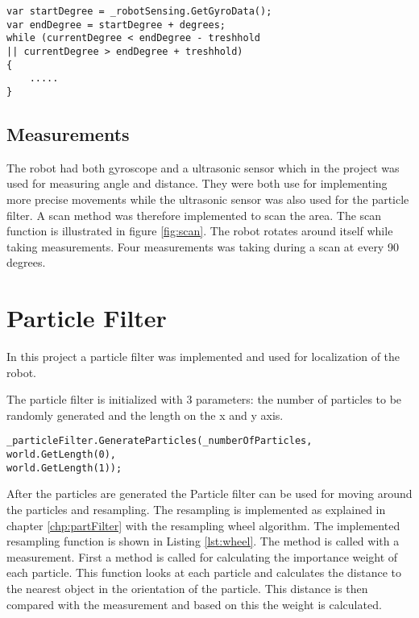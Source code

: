 \lstset{style=sharpc}
\begin{lstlisting}[caption={Pseduo code for turning the robot}, label=lst:turn, mathescape=true]             
var startDegree = _robotSensing.GetGyroData();
var endDegree = startDegree + degrees;
while (currentDegree < endDegree - treshhold 
|| currentDegree > endDegree + treshhold)
{	
	.....
}
\end{lstlisting}


\FloatBarrier
\subsection{Measurements}
The robot had both gyroscope and a ultrasonic sensor which in the project was used for measuring angle and distance. They were both use for implementing more precise movements while the ultrasonic sensor was also used for the particle filter. A scan method was therefore implemented to scan the area. The scan function is illustrated in figure \ref{fig:scan}. The robot rotates around itself while taking measurements. Four measurements was taking during a scan at every 90 degrees.


\FloatBarrier
\section{Particle Filter}
In this project a particle filter was implemented and used for localization of the robot. 

The particle filter is initialized with 3 parameters: the number of particles to be randomly generated and the length on the x and y axis.

\lstset{style=sharpc}
\begin{lstlisting}[caption={Initialization of the particle filter}, label=lst:initPart, mathescape=true]             
_particleFilter.GenerateParticles(_numberOfParticles, world.GetLength(0),
world.GetLength(1));
\end{lstlisting}

After the particles are generated the Particle filter can be used for moving around the particles and resampling. The resampling is implemented as explained in chapter \ref{chp:partFilter} with the resampling wheel algorithm. The implemented resampling function is shown in Listing \ref{lst:wheel}. The method is called with a measurement. First a method is called for calculating the importance weight of each particle. This function looks at each particle and calculates the distance to the nearest object in the orientation of the particle. This distance is then compared with the measurement and based on this the weight is calculated.

